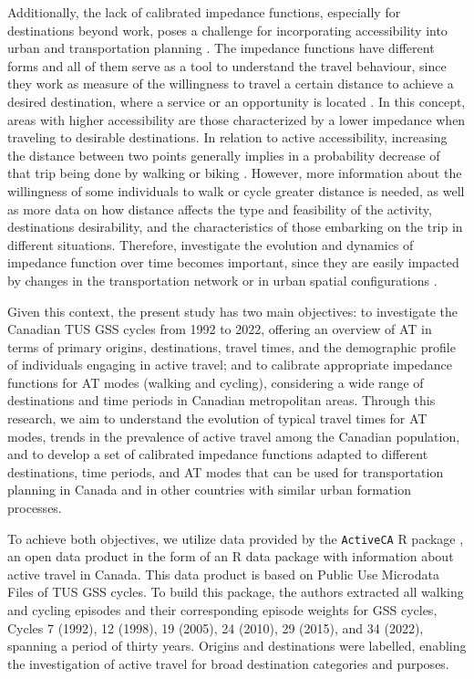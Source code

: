 \documentclass[preprint, 3p,
authoryear]{elsarticle} %
\begin{document}
Additionally, the lack of calibrated impedance functions, especially for
destinations beyond work, poses a challenge for incorporating
accessibility into urban and transportation planning
\citep{pereira2023}. The impedance functions have different forms and
all of them serve as a tool to understand the travel behaviour, since
they work as measure of the willingness to travel a certain distance to
achieve a desired destination, where a service or an opportunity is
located
\citep{papa2012gravity, yang2012walking, millward2013active, vale2017influence}.
In this concept, areas with higher accessibility are those characterized
by a lower impedance when traveling to desirable destinations. In
relation to active accessibility, increasing the distance between two
points generally implies in a probability decrease of that trip being
done by walking or biking
\citep{hansen1959, geurs2001accessibility, geurs2004, levinson2005access, cascetta2013new}.
However, more information about the willingness of some individuals to
walk or cycle greater distance is needed, as well as more data on how
distance affects the type and feasibility of the activity, destinations
desirability, and the characteristics of those embarking on the trip in
different situations. Therefore, investigate the evolution and dynamics
of impedance function over time becomes important, since they are easily
impacted by changes in the transportation network or in urban spatial
configurations \citep{iacono2008access, iacono2010}.

Given this context, the present study has two main objectives: to
investigate the Canadian TUS GSS cycles from 1992 to 2022, offering an
overview of AT in terms of primary origins, destinations, travel times,
and the demographic profile of individuals engaging in active travel;
and to calibrate appropriate impedance functions for AT modes (walking
and cycling), considering a wide range of destinations and time periods
in Canadian metropolitan areas. Through this research, we aim to
understand the evolution of typical travel times for AT modes, trends in
the prevalence of active travel among the Canadian population, and to
develop a set of calibrated impedance functions adapted to different
destinations, time periods, and AT modes that can be used for
transportation planning in Canada and in other countries with similar
urban formation processes.

To achieve both objectives, we utilize data provided by the
\texttt{ActiveCA} R package \citep{dossantos2025}, an open data product
in the form of an R data package with information about active travel in
Canada. This data product is based on Public Use Microdata Files of TUS
GSS cycles. To build this package, the authors extracted all walking and
cycling episodes and their corresponding episode weights for GSS cycles,
Cycles 7 (1992), 12 (1998), 19 (2005), 24 (2010), 29 (2015), and 34
(2022), spanning a period of thirty years. Origins and destinations were
labelled, enabling the investigation of active travel for broad
destination categories and purposes.
\end{document}
